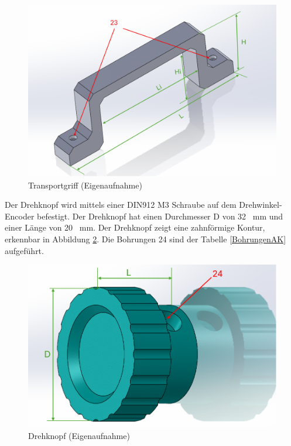 \begin{figure}[H]
	\begin{center}
		\includegraphics[width=\textwidth]{Images/Konstruktion/GriffK.png}
		\caption{Transportgriff (Eigenaufnahme)} \label{GriffK}
	\end{center}
\end{figure}  

Der Drehknopf wird mittels einer DIN912 M3 Schraube auf dem Drehwinkel-Encoder befestigt. Der Drehknopf hat einen Durchmesser D von 32 \ mm und einer Länge von 20 \ mm. Der Drehknopf zeigt eine zahnförmige Kontur, erkennbar in Abbildung \ref{DrehKnopfK}. Die Bohrungen 24 sind der Tabelle \ref{BohrungenAK} aufgeführt.

\begin{figure}[H]
	\begin{center}
		\includegraphics[width=\textwidth]{Images/Konstruktion/DrehKnopfK.png}
		\caption{Drehknopf (Eigenaufnahme)} \label{DrehKnopfK}
	\end{center}
\end{figure}  

